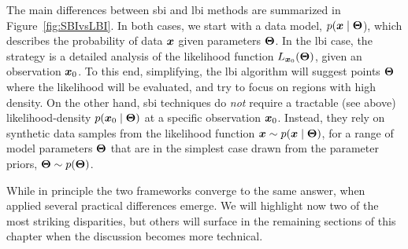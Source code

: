 The main differences between \gls*{sbi} and  \gls*{lbi} methods are summarized in Figure~\ref{fig:SBIvsLBI}. In both cases, we start with a data model, $p(\bm{x}\mid\bm{\Theta}$), which describes the probability of data $\bm{x}$ given parameters $\bm{\Theta}$. In the \gls*{lbi} case, the strategy is a detailed analysis of the likelihood function $L_{\bm{x}_0}(\bm{\Theta})$, given an observation $\bm{x}_0$. To this end, simplifying, the \gls*{lbi} algorithm will suggest points $\bm{\Theta}$ where the likelihood will be evaluated, and try to focus on regions with high density. On the other hand, \gls*{sbi} techniques do \emph{not} require a tractable (see above) likelihood-density $p(\bm{x}_0\mid\bm{\Theta})$ at a specific observation $\bm{x}_0$. Instead, they rely on synthetic data samples from the likelihood function $\bm{x} \sim p(\bm{x}\mid\bm{\Theta})$, for a range of model parameters $\bm{\Theta}$ that are in the simplest case drawn from the parameter priors, $\bm{\Theta} \sim p(\bm{\Theta})$. %



While in principle the two frameworks converge to the same answer, when applied several practical differences emerge. We will highlight now two of the most striking disparities, but others will surface in the remaining sections of this chapter when the discussion becomes more technical.

